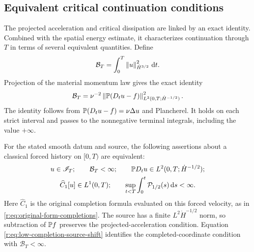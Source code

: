 
\subsection{Equivalent critical continuation conditions}
\label{r:sec:terminal-characterization}

The projected acceleration and critical dissipation are linked by
an exact identity. Combined with the spatial energy estimate, it
characterizes continuation through \(T\) in terms of several
equivalent quantities.
Define
\[
 \mathcal B_T=\int_0^T\left\lVert u\right\rVert_{\dot H^{3/2}}^2\,\mathrm d t.
\]
Projection of the material momentum law gives the exact identity
\begin{equation}
 \mathcal B_T
 =\nu^{-2}\left\lVert \mathbb P(D_tu-f)\right\rVert_{L^2(0,T;\dot H^{-1/2})}^2.
 \label{r:eq:projected-response-identity}
\end{equation}
The identity follows from \(\mathbb P(D_tu-f)=\nu\Delta u\) and Plancherel.
It holds on each strict interval and passes to the nonnegative terminal
integrals, including the value \(+\infty\).

For the stated smooth datum and source, the following assertions about
a classical forced history on \([0,T)\) are equivalent:
\begin{equation}
 \begin{gathered}
 u\in\mathscr I_T;\qquad
 \mathcal B_T<\infty;\qquad
 \mathbb P D_tu\in L^2(0,T;\dot H^{-1/2});\\
 \widehat C_1[u]\in L^1(0,T);\qquad
 \sup_{t<T}\int_0^t\mathcal P_{1/2}(s)\,\mathrm d s<\infty.
 \end{gathered}
 \label{r:eq:terminal-equivalent-statements}
\end{equation}
Here \(\widehat C_1\) is the original completion formula evaluated on
this forced velocity, as in \eqref{r:eq:original-form-completions}.
The source has a finite \(L^2\dot H^{-1/2}\) norm, so subtraction of
\(\mathbb P f\) preserves the projected-acceleration condition.
Equation \eqref{r:eq:low-completion-source-shift} identifies the
completed-coordinate condition with \(\mathcal B_T<\infty\).

